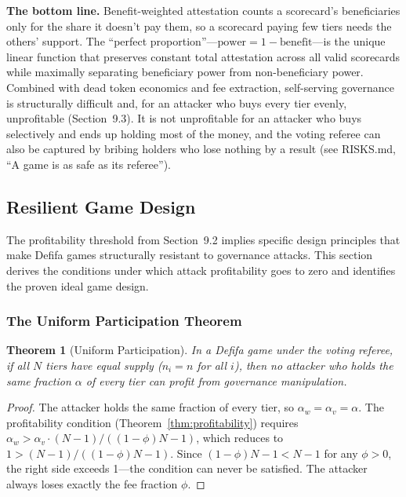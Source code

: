 \documentclass[11pt,a4paper]{article}
\newtheorem{theorem}{Theorem}
\begin{document}
\textbf{The bottom line.} Benefit-weighted attestation counts a scorecard's beneficiaries only for the share it doesn't pay them, so a scorecard paying few tiers needs the others' support. The ``perfect proportion''---$\text{power} = 1 - \text{benefit}$---is the unique linear function that preserves constant total attestation across all valid scorecards while maximally separating beneficiary power from non-beneficiary power. Combined with dead token economics and fee extraction, self-serving governance is structurally difficult and, for an attacker who buys every tier evenly, unprofitable (Section~9.3). It is not unprofitable for an attacker who buys selectively and ends up holding most of the money, and the voting referee can also be captured by bribing holders who lose nothing by a result (see RISKS.md, ``A game is as safe as its referee'').

\subsection{Resilient Game Design}\label{sec:game-design}

The profitability threshold from Section~9.2 implies specific design principles that make Defifa games structurally resistant to governance attacks. This section derives the conditions under which attack profitability goes to zero and identifies the proven ideal game design.

\subsubsection{The Uniform Participation Theorem}

\begin{theorem}[Uniform Participation]\label{thm:uniform}
In a Defifa game under the voting referee, if all $N$ tiers have equal supply ($n_i = n$ for all $i$), then no attacker who holds the same fraction $\alpha$ of every tier can profit from governance manipulation.
\end{theorem}

\begin{proof}
The attacker holds the same fraction of every tier, so $\alpha_w = \alpha_v = \alpha$. The profitability condition (Theorem~\ref{thm:profitability}) requires $\alpha_w > \alpha_v \cdot (N-1)/((1-\phi)N - 1)$, which reduces to $1 > (N-1)/((1-\phi)N - 1)$. Since $(1-\phi)N - 1 < N - 1$ for any $\phi > 0$, the right side exceeds 1---the condition can never be satisfied. The attacker always loses exactly the fee fraction $\phi$.
\end{proof}
\end{document}
